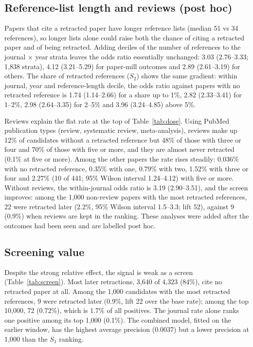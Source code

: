 \documentclass[pdflatex,sn-basic]{sn-jnl}
\begin{document}
\subsection{Reference-list length and reviews (post hoc)}
Papers that cite a retracted paper have longer reference lists (median 51 vs 34 references), so longer lists alone
could raise both the chance of citing a retracted paper and of being retracted. Adding deciles of the number of
references to the journal $\times$ year strata leaves the odds ratio essentially unchanged: 3.03 (2.76--3.33; 1,838
strata), 4.12 (3.21--5.29) for paper-mill outcomes and 2.89 (2.61--3.19) for others. The share of retracted references
($S_2$) shows the same gradient: within journal, year and reference-length decile, the odds ratio against papers
with no retracted reference is 1.74 (1.14--2.66) for a share up to 1\%, 2.82 (2.33--3.41) for 1--2\%, 2.98
(2.64--3.35) for 2--5\% and 3.96 (3.24--4.85) above 5\%.

Reviews explain the flat rate at the top of Table~\ref{tab:dose}. Using PubMed publication types (review, systematic
review, meta-analysis), reviews make up 12\% of candidates without a retracted reference but 48\% of those with three
or four and 70\% of those with five or more, and they are almost never retracted (0.1\% at five or more). Among the
other papers the rate rises steadily: 0.036\% with no retracted reference, 0.35\% with one, 0.79\% with two,
1.52\% with three or four and 2.27\% (10 of 441; 95\% Wilson interval 1.24--4.12) with five or more. Without reviews, the within-journal odds ratio is
3.19 (2.90--3.51), and the screen improves: among the 1,000 non-review papers with the most retracted references, 22
were retracted later (2.2\%, 95\% Wilson interval 1.5--3.3; lift 52), against 9 (0.9\%) when reviews are kept in
the ranking. These analyses were added after the outcomes had been seen and are labelled post hoc.

\subsection{Screening value}
Despite the strong relative effect, the signal is weak as a screen (Table~\ref{tab:screen}). Most later retractions,
3,640 of 4,323 (84\%), cite no retracted paper at all. Among the 1,000 candidates with the most retracted references,
9 were retracted later (0.9\%, lift 22 over the base rate); among the top 10,000, 72 (0.72\%), which is 1.7\% of all
positives. The journal rate alone ranks one positive among its top 1,000 (0.1\%). The combined model, fitted on the earlier
window, has the highest average precision (0.0037) but a lower precision at 1,000 than the $S_1$ ranking.
\end{document}
